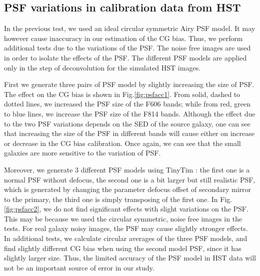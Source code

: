 \documentclass[useAMS,usenatbib]{mn2e}
\begin{document}
\subsection{PSF variations in calibration data from HST}

In the previous test, we used an ideal circular symmetric Airy PSF
model. It may however cause inaccuracy in our estimation of the CG
bias. Thus, we perform additional tests due to the variations of the
PSF. The noise free images are used in order to isolate the effects of
the PSF. The different PSF models are applied only in the step of
deconvolution for the simulated HST images.

First we generate three pairs of PSF model by slightly increasing the 
size of PSF. The
effect on the CG bias is shown in Fig.\ref{fig:psfacc1}. From solid,
dashed to dotted lines, we increased the PSF size of the F606 bands; while
from red, green to blue lines, we increase the PSF size of the F814
bands. Although the effect due to the two PSF variations depends on the
SED of the source galaxy, one can see that increasing the size of the
PSF in different bands will cause either on increase or
decrease in the CG bias calibration. Once again, we can see that
the small galaxies are more sensitive to the variation of PSF.

Moreover, we generate 3 different PSF models using TinyTim
\citep{2011SPIE.8127E..0JK}: the first one is a normal PSF without
defocus, the second one is a bit larger but still realistic PSF, which
is generated by changing the parameter defocus offset of secondary
mirror to the primary, the third one is simply transposing of the
first one.  In Fig.\ref{fig:psfacc2}, we do not find significant
effects with slight variations on the PSF. This may be because we used
the circular symmetric, noise free images in the tests. For real
galaxy noisy images, the PSF may cause slightly stronger effects. In
additional tests, we calculate circular averages of the three PSF
models, and find slightly different CG bias when using the second
model PSF, since it has slightly larger size. Thus, the limited
accuracy of the PSF model in HST data
will not be an important source of error in our study.
\end{document}
